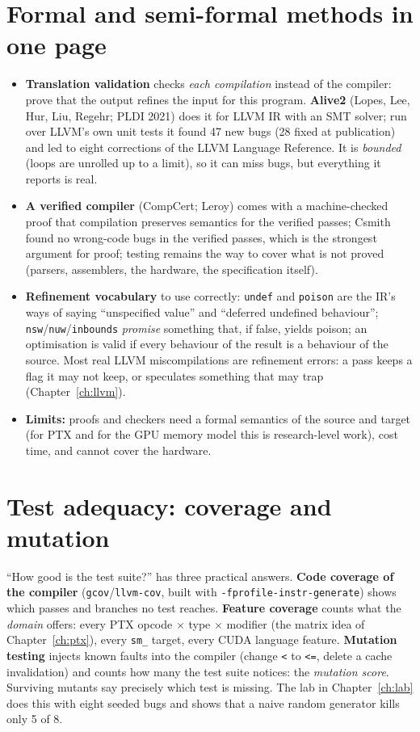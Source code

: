 \documentclass[10pt,a4paper,openany,oneside]{report}
\newcommand{\prio}[1]{\texorpdfstring{\ifcase#1\or{\color{gold}\ding{72}}\or{\color{gold}\ding{72}\ding{72}}\or{\color{gold}\ding{72}\ding{72}\ding{72}}\fi}{}}
\begin{document}
\section{Formal and semi-formal methods in one page \prio{2}}
\begin{itemize}[nosep]
\item \textbf{Translation validation} checks \emph{each compilation} instead of the compiler: prove that the output refines the input for this program. \textbf{Alive2} (Lopes, Lee, Hur, Liu, Regehr; PLDI 2021) does it for LLVM IR with an SMT solver; run over LLVM's own unit tests it found 47 new bugs (28 fixed at publication) and led to eight corrections of the LLVM Language Reference. It is \emph{bounded} (loops are unrolled up to a limit), so it can miss bugs, but everything it reports is real.
\item \textbf{A verified compiler} (CompCert; Leroy) comes with a machine-checked proof that compilation preserves semantics for the verified passes; Csmith found no wrong-code bugs in the verified passes, which is the strongest argument for proof; testing remains the way to cover what is not proved (parsers, assemblers, the hardware, the specification itself).
\item \textbf{Refinement vocabulary} to use correctly: \texttt{undef} and \texttt{poison} are the IR's ways of saying ``unspecified value'' and ``deferred undefined behaviour''; \texttt{nsw}/\texttt{nuw}/\texttt{inbounds} \emph{promise} something that, if false, yields poison; an optimisation is valid if every behaviour of the result is a behaviour of the source. Most real LLVM miscompilations are refinement errors: a pass keeps a flag it may not keep, or speculates something that may trap (Chapter~\ref{ch:llvm}).
\item \textbf{Limits:} proofs and checkers need a formal semantics of the source and target (for PTX and for the GPU memory model this is research-level work), cost time, and cannot cover the hardware.
\end{itemize}

\section{Test adequacy: coverage and mutation \prio{2}}
``How good is the test suite?'' has three practical answers. \textbf{Code coverage of the compiler} (\texttt{gcov}/\texttt{llvm-cov}, built with \texttt{-fprofile-instr-generate}) shows which passes and branches no test reaches. \textbf{Feature coverage} counts what the \emph{domain} offers: every PTX opcode $\times$ type $\times$ modifier (the matrix idea of Chapter~\ref{ch:ptx}), every \texttt{sm\_} target, every CUDA language feature. \textbf{Mutation testing} injects known faults into the compiler (change \texttt{<} to \texttt{<=}, delete a cache invalidation) and counts how many the test suite notices: the \emph{mutation score}. Surviving mutants say precisely which test is missing. The lab in Chapter~\ref{ch:lab} does this with eight seeded bugs and shows that a naive random generator kills only 5 of 8.
\end{document}
